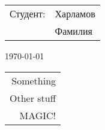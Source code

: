 \documentclass{article}
\makeatletter
\newcommand{\handplaceholder}[4]{
    \bgroup
      \renewcommand*{\arraystretch}{0}
      \begin{tabular}{@{}l>{\centering\arraybackslash}p{#1}@{}}
        #2 & #3 \\
        \cline{2-2}
           & {\scriptsize #4}
      \end{tabular}
    \egroup
  }
\newcounter{magicrownumbers}
\newcommand\rownumber{\stepcounter{magicrownumbers}\arabic{magicrownumbers}}
\makeatother
\begin{document}
%                                                                
  \handplaceholder{3cm}{Студент:}{Харламов}{Фамилия} \hfill \today

%                                                                        
  \begin{tabular}{@{\makebox[3em][r]{\rownumber\space}} | r}
    Something \\
    Other stuff \\
    MAGIC!
  \end{tabular}


\end{document}
